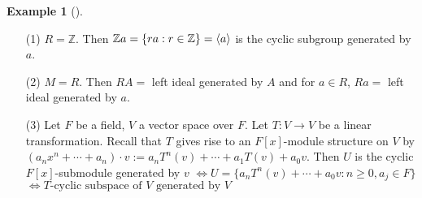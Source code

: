 \documentclass{article}
\theoremstyle{definition}
\newtheorem{ex}{Example}
\newenvironment{exs}[1][]{%
  \begin{ex}[#1]$ $\par\nobreak\ignorespaces
}{%
  \end{ex}
}
\newcommand{\ZZ}{\mathbb Z}
\newcommand{\Lra}{\Leftrightarrow}
\begin{document}
\begin{exs}
	\begin{enumerate}
		\item[(1)] $R = \ZZ$.
			Then $\ZZ a = \{ra: r \in \ZZ\} = \ev{a}$ is the cyclic subgroup generated by $a$.

		\item[(2)] $M = R$.
			Then $RA = $ left ideal generated by $A$ and for $a \in R$, $Ra =$ left ideal generated by $a$.

		\item[(3)] Let $F$ be a field, $V$ a vector space over $F$.
			Let $T: V \to V$ be a linear transformation.
			Recall that $T$ gives rise to an $F[x]$-module structure on $V$ by $(a_n x^n + \cdots + a_n) \cdot v := a_n T^n (v) + \cdots + a_1 T(v) + a_0 v$.
			Then $U$ is the cyclic $F[x]$-submodule generated by $v$ 
			$\Lra U = \{a_n T^n(v) + \cdots + a_0 v: n \geq 0, a_j \in F\}$
			$\Lra T\text{-cyclic subspace of } V \text{ generated by }V$

	\end{enumerate}
\end{exs}
\end{document}
